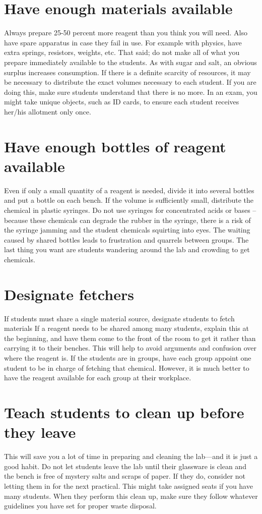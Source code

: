 \section{Have enough materials available}
Always prepare 25-50 percent more reagent 
than you think you will need. 
Also have spare apparatus in case they fail in use. 
For example with physics, 
have extra springs, 
resistors, 
weights, 
etc. 
That said; do not make all of what you prepare 
immediately available to the students. 
As with sugar and salt, 
an obvious surplus increases consumption. 
If there is a definite scarcity of resources, 
it may be necessary to distribute the exact volumes necessary 
to each student. 
If you are doing this, 
make sure students understand that there is no more. 
In an exam, 
you might take unique objects, 
such as ID cards, 
to ensure each student receives her/his allotment only once.

\section{Have enough bottles of reagent available}
Even if only a small quantity of a reagent is needed, 
divide it into several bottles and put a bottle on each bench. 
If the volume is sufficiently small, 
distribute the chemical in plastic syringes. 
Do not use syringes for concentrated acids or bases – 
because these chemicals can degrade the rubber in the syringe, 
there is a risk of the syringe jamming 
and the student chemicals squirting into eyes. 
The waiting caused by shared bottles leads 
to frustration and quarrels between groups. 
The last thing you want are students wandering around the lab 
and crowding to get chemicals. 

\section{Designate fetchers}
If students must share a single material source, 
designate students to fetch materials
If a reagent needs to be shared among many students, 
explain this at the beginning, 
and have them come to the front of the room to get it 
rather than carrying it to their benches. 
This will help to avoid arguments 
and confusion over where the reagent is. 
If the students are in groups, 
have each group appoint one student 
to be in charge of fetching that chemical. 
However, 
it is much better to have the reagent available 
for each group at their workplace.

\section{Teach students to clean up before they leave}
This will save you a lot of time in preparing 
and cleaning the lab—and it is just a good habit. 
Do not let students leave the lab until their glassware is 
clean and the bench is free of mystery salts and scraps of paper. 
If they do, 
consider not letting them in for the next practical. 
This might take assigned seats if you have many students. 
When they perform this clean up, 
make sure they follow whatever guidelines 
you have set for proper waste disposal.

